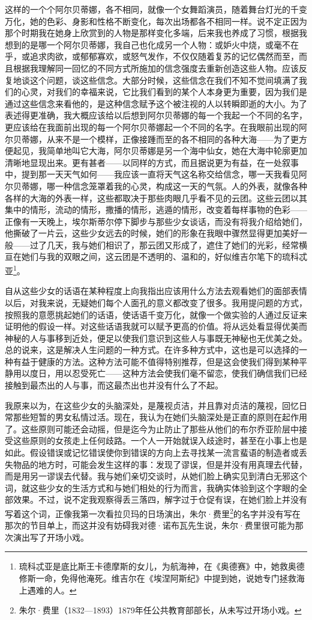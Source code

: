 \par 这样的一个个阿尔贝蒂娜，各不相同，就像一个女舞蹈演员，随着舞台灯光的千变万化，她的色彩、身影和性格不断变化，每次出场都各不相同一样。说不定正因为那个时期我在她身上欣赏到的人物是那样变化多端，后来我也养成了习惯，根据我想到的是哪一个阿尔贝蒂娜，我自己也化成另一个人物：或妒火中烧，或毫不在乎，或追求肉欲，或郁郁寡欢，或怒气发作，不仅仅随着复苏的记忆偶然而至，而且根据我理解同一回忆的不同方式所施加的信念强度去重新创造这些人物。应该反复地谈这个问题，谈这些信念。大部分时候，这些信念在我们不知不觉间填满了我们的心灵，对我们的幸福来说，它比我们看到的某个人本身更为重要，因为我们是通过这些信念来看他的，是这种信念赋予这个被注视的人以转瞬即逝的大小。为了表述得更准确，我大概应该给以后想到阿尔贝蒂娜的每一个我起一个不同的名字，更应该给在我面前出现的每一个阿尔贝蒂娜起一个不同的名字。在我眼前出现的阿尔贝蒂娜，从来不是一个模样，正像接踵而至的各不相同的各种大海——为了更方便起见，我简单地叫它大海，阿尔贝蒂娜是另一个海中仙女，她在大海中轮廓更加清晰地显现出来。更有甚者——以同样的方式，而且据说更为有益，在一处叙事中，提到那一天天气如何——我应该一直将天气这名称交给信念，哪一天我看见阿尔贝蒂娜，哪一种信念笼罩着我的心灵，构成这一天的气氛。人的外表，就像各种各样的大海的外表一样，这些都取决于那些肉眼几乎看不见的云团。这些云团以其集中的情形，流动的情形，撒播的情形，逃遁的情形，改变着每样事物的色彩——正像有一天晚上，埃尔斯蒂尔停下脚步与那些少女谈话，而没有将我介绍给她们，他撕破了一片云，这些少女远去的时候，她们的形象在我眼中骤然显得更加美好一般——过了几天，我与她们相识了，那云团又形成了，遮住了她们的光彩，经常横亘在她们与我的双眼之间，这云团是不透明的、温和的，好似维吉尔笔下的琉科忒亚\footnote{琉科忒亚是底比斯王卡德摩斯的女儿，为航海神，在《奥德赛》中，她救奥德修斯一命，免得他淹死。维吉尔在《埃涅阿斯纪》中提到她，说她专门拯救海上遇难的人。}。
\par 自从这些少女的话语在某种程度上向我指出应该用什么方法去观看她们的面部表情以后，对我来说，无疑她们每个人面孔的意义都改变了很多。我用提问题的方式，按照我的意愿挑起她们的话语，使话语千变万化，就像一个做实验的人通过反证来证明他的假设一样。对这些话语我就可以赋予更高的价值。将从远处看显得优美而神秘的人与事移到近处，便足以使我们意识到这些人与事既无神秘也无优美之处。总的说来，这是解决人生问题的一种方式。在许多种方式中，这也是可以选择的一种有益于健康的方法。这种方法可能不值得特别推荐，但是这会使我们得到某种平静用以度日，用以忍受死亡——这种方法会使我们毫不留恋，使我们确信我们已经接触到最杰出的人与事，而这最杰出也并没有什么了不起。
\par 我原来以为，在这些少女的头脑深处，是蔑视贞洁，并且靠对贞洁的蔑视，回忆日常那些短暂的男女私情过活。现在，我认为在她们头脑深处是正直的原则在起作用了。这些原则可能还会动摇，但是迄今为止防止了那些从他们的布尔乔亚阶层中接受这些原则的女孩走上任何歧路。一个人一开始就误入歧途时，甚至在小事上也是如此。假设错误或记忆错误使你到错误的方向上去寻找某一流言蜚语的制造者或丢失物品的地方时，可能会发生这样的事：发现了谬误，但是并没有用真理去代替，而是用另一谬误去代替。我与她们亲切交谈时，从她们脸上确实见到清白无邪这个词，就这些少女的生活方式和与她们相处的行为而言，我确实体验到这个字眼的全部效果。不过，说不定我观察得丢三落四，解字过于仓促有误，在她们脸上并没有写着这个词，正像我第一次看拉贝玛的日场演出，朱尔·费里\footnote{朱尔·费里（1832—1893）1879年任公共教育部部长，从未写过开场小戏。}的名字并没有写在那次的节目单上，而这并没有妨碍我对德·诺布瓦先生说，朱尔·费里很可能为那次演出写了开场小戏。
